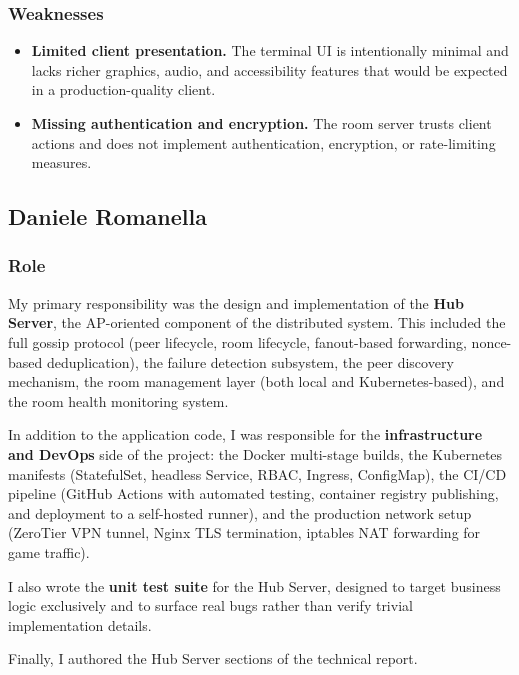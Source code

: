 \subsubsection{Weaknesses}

\begin{itemize}
  \item \textbf{Limited client presentation.} The terminal UI is intentionally minimal and lacks richer graphics, audio, and accessibility features that would be expected in a production-quality client.

  \item \textbf{Missing authentication and encryption.} The room server trusts client actions and does not implement authentication, encryption, or rate-limiting measures.

\end{itemize}

\subsection{Daniele Romanella}

\subsubsection{Role}

My primary responsibility was the design and implementation of the \textbf{Hub Server}, the AP-oriented component of the distributed system.
This included the full gossip protocol (peer lifecycle, room lifecycle, fanout-based forwarding, nonce-based deduplication), the failure detection subsystem, the peer discovery mechanism, the room management layer (both local and Kubernetes-based), and the room health monitoring system.

In addition to the application code, I was responsible for the \textbf{infrastructure and DevOps} side of the project:
the Docker multi-stage builds, the Kubernetes manifests (StatefulSet, headless Service, RBAC, Ingress, ConfigMap), the CI/CD pipeline (GitHub Actions with automated testing, container registry publishing, and deployment to a self-hosted runner), and the production network setup (ZeroTier VPN tunnel, Nginx TLS termination, iptables NAT forwarding for game traffic).

I also wrote the \textbf{unit test suite} for the Hub Server, designed to target business logic exclusively and to surface real bugs rather than verify trivial implementation details.

Finally, I authored the Hub Server sections of the technical report.

